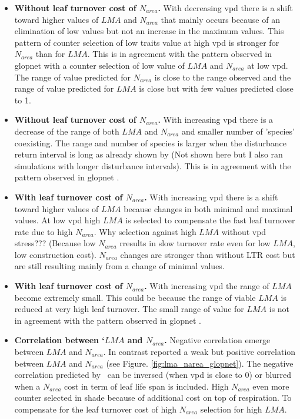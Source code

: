 \documentclass[a4paper,11pt]{article}
\begin{document}
\begin{itemize}
  
\item \textbf{Without leaf turnover cost of $N_{area}$.} With
  decreasing vpd there is a shift toward higher values of $LMA$ and
  $N_{area}$ that mainly occurs because of an elimination of low
  values but not an increase in the maximum values. This pattern of
  counter selection of low traits value at high vpd is stronger for
  $N_{area}$ than for $LMA$. This is in agreement with the pattern
  observed in glopnet \citep{Wright-2004} with a counter selection of
  low value of $LMA$ and $N_{area}$ at low vpd. The range of value
  predicted for $N_{area}$ is close to the range observed and the
  range of value predicted for $LMA$ is close but with few values
  predicted close
  to 1.  

\item \textbf{Without leaf turnover cost of $N_{area}$.} With
  increasing vpd there is a decrease of the range of both $LMA$ and
  $N_{area}$ and smaller number of 'species' coexisting. The range and
  number of species is larger when the disturbance return interval is
  long as already shown by \citet{Falster-2017} (Not shown here but I
  also ran simulations with longer disturbance intervals). This is in agreement with the pattern observed in glopnet \citep{Wright-2004}.

\item \textbf{With leaf turnover cost of $N_{area}$.} With increasing
  vpd there is a shift toward higher values of $LMA$ because changes
  in both minimal and maximal values. At low vpd high $LMA$ is
  selected to compensate the fast leaf turnover rate due to high
  $N_{area}$. Why selection against high $LMA$ without vpd stress???
  (Because low $N_{area}$ rresults in slow turnover rate even for low
  $LMA$, low construction cost). $N_{area}$ changes are stronger
  than without LTR cost but are still resulting mainly from a change
  of minimal values. 

\item \textbf{With leaf turnover cost of $N_{area}$.} With increasing
  vpd the range of $LMA$ become extremely small. This could be because
  the range of viable $LMA$ is reduced at very high leaf turnover. The small range of
  value for $LMA$ is not in agreement with the pattern observed in
  glopnet \citep{Wright-2004}. 

\item \textbf{Correlation between `$LMA$ and $N_{area}$.} Negative correlation emerge between $LMA$ and $N_{area}$. In contrast \citet{Wright-2004}
  reported a weak but positive correlation between $LMA$ and
  $N_{area}$ (see Figure. \ref{fig:lma_narea_glopnet}). The
  negative correlation predicted by \plant\ can be inversed (when vpd
  is close to 0) or
 blurred when a $N_{area}$ cost in term of leaf life span is
 included.  High $N_{area}$ even more counter selected in shade
 because of additional cost on top of respiration. To compensate for
 the leaf turnover cost of high $N_{area}$ selection for high $LMA$.

\end{itemize}
\end{document}

